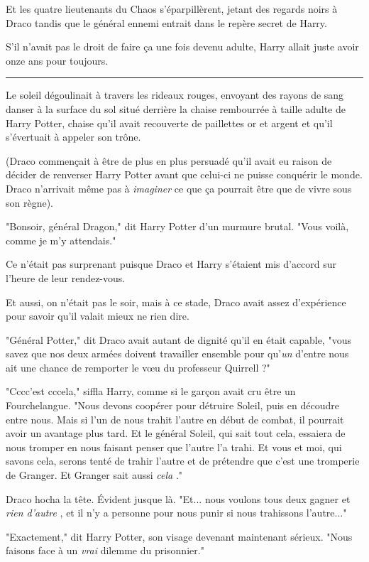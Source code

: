 Et les quatre lieutenants du Chaos s'éparpillèrent, jetant des regards noirs à Draco tandis que le général ennemi entrait dans le repère secret de Harry.

S'il n'avait pas le droit de faire ça une fois devenu adulte, Harry allait juste avoir onze ans pour toujours.
\par\noindent\rule{\textwidth}{0.4pt}
Le soleil dégoulinait à travers les rideaux rouges, envoyant des rayons de sang danser à la surface du sol situé derrière la chaise rembourrée à taille adulte de Harry Potter, chaise qu'il avait recouverte de paillettes or et argent et qu'il s'évertuait à appeler son trône.

(Draco commençait à être de plus en plus persuadé qu'il avait eu raison de décider de renverser Harry Potter avant que celui-ci ne puisse conquérir le monde. Draco n'arrivait même pas à \emph{imaginer}  ce que ça pourrait être que de vivre sous son règne).

"Bonsoir, général Dragon," dit Harry Potter d'un murmure brutal. "Vous voilà, comme je m'y attendais."

Ce n'était pas surprenant puisque Draco et Harry s'étaient mis d'accord sur l'heure de leur rendez-vous.

Et aussi, on n'était pas le soir, mais à ce stade, Draco avait assez d'expérience pour savoir qu'il valait mieux ne rien dire.

"Général Potter," dit Draco avait autant de dignité qu'il en était capable, "vous savez que nos deux armées doivent travailler ensemble pour qu'\emph{un}  d'entre nous ait une chance de remporter le vœu du professeur Quirrell ?"

"Cccc'est cccela," siffla Harry, comme si le garçon avait cru être un Fourchelangue. "Nous devons coopérer pour détruire Soleil, puis en découdre entre nous. Mais si l'un de nous trahit l'autre en début de combat, il pourrait avoir un avantage plus tard. Et le général Soleil, qui sait tout cela, essaiera de nous tromper en nous faisant penser que l'autre l'a trahi. Et vous et moi, qui savons cela, serons tenté de trahir l'autre et de prétendre que c'est une tromperie de Granger. Et Granger sait aussi \emph{cela} ."

Draco hocha la tête. Évident jusque là. "Et... nous voulons tous deux gagner et \emph{rien d'autre} , et il n'y a personne pour nous punir si nous trahissons l'autre..."

"Exactement," dit Harry Potter, son visage devenant maintenant sérieux. "Nous faisons face à un \emph{vrai}  dilemme du prisonnier."


